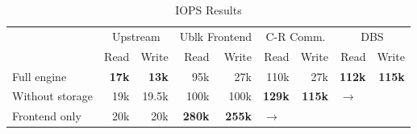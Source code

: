 \begin{table*}[tb]
\centering
\caption{IOPS Results}
\label{tab:iops}
\begin{tabular}{|l|r|r|r|r|r|r|r|r|} 
\hline
\multirow{2}{*}{}   & \multicolumn{2}{c|}{Upstream} & \multicolumn{2}{c|}{Ublk Frontend} & \multicolumn{2}{c|}{C-R Comm.} & \multicolumn{2}{c|}{DBS} \\
\cline{2-9}
                & Read & Write                      & Read & Write                      & Read & Write                      & Read & Write \\ 
\hline
Full engine     & \textbf{17k}  & \textbf{13k}      & 95k  & 27k                        & 110k & 27k                        & \textbf{112k} & \textbf{115k} \\ 
\hline
Without storage & 19k  & 19.5k                      & 100k & 100k                       & \textbf{129k} & \textbf{115k}     & \multicolumn{2}{l|}{$\rightarrow$} \\ 
\hline
Frontend only   & 20k  & 20k                        & \textbf{280k} & \textbf{255k}     & \multicolumn{4}{l|}{$\rightarrow$} \\
\hline
\end{tabular}
\end{table*}
